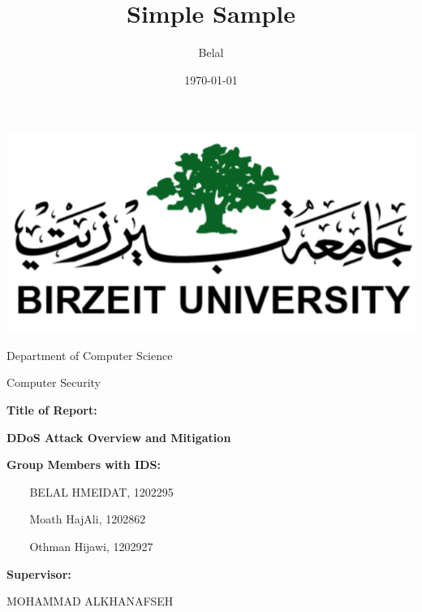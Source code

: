 \documentclass[a4paper, 12pt]{report} %
\title{Simple Sample} %
\author{Belal} %
\date{\today} %
\begin{document}
 
\setlength{\cftbeforetoctitleskip}{0pt plus 1pt} %
\setlength{\cftbeforeloftitleskip}{0pt plus 1pt} %
\setlength{\cftbeforelottitleskip}{0pt plus 1pt} %
    \begin{titlepage}
        \begin{center}
            \includegraphics{Birzeit_Logo.png}

            Department of Computer Science 
            \vspace{0.8cm}

            Computer Security
            \vspace{0.8cm}
            
            \end{center}
            
            \textbf{\large{Title of Report:}}
            \vspace{0.4cm}
            
            \begin{center}
                \textbf{\Large{DDoS Attack Overview and Mitigation}}
            \end{center} 
            \vspace{0.8cm}
            
            \textbf{\large{Group Members with IDS:}}
            
            \hrulefill
            \begin{itemize}
                \item[$ $] BELAL HMEIDAT, 1202295 %
                \item[$ $] Moath HajAli, 1202862
                \item[$ $] Othman Hijawi, 1202927
            \end{itemize}
            

            \vspace{0.8cm}

            \textbf{\large{Supervisor:}}
            \vspace{0.4cm}
            
            \hspace{\parindent}MOHAMMAD ALKHANAFSEH %
            \pagebreak

    \end{titlepage}
\end{document}
